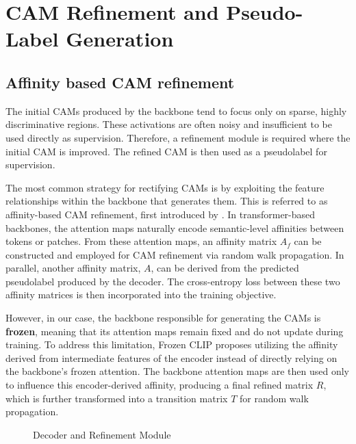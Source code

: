 \section{CAM Refinement and Pseudo-Label Generation}
\label{sec:refinement}
\subsection{Affinity based CAM refinement}  
The initial CAMs produced by the backbone tend to focus only on sparse, highly discriminative regions. These activations are often noisy and insufficient to be used directly as supervision. Therefore, a refinement module is required where the initial CAM is improved. The refined CAM is then used as a pseudolabel for supervision.  

The most common strategy for rectifying CAMs is by exploiting the feature relationships within the backbone that generates them. This is referred to as affinity-based CAM refinement, first introduced by \cite{wsss_affinitynet}. In transformer-based backbones, the attention maps naturally encode semantic-level affinities between tokens or patches. From these attention maps, an affinity matrix $A_f$ can be constructed and employed for CAM refinement via random walk propagation. In parallel, another affinity matrix, $A$, can be derived from the predicted pseudolabel produced by the decoder. The cross-entropy loss between these two affinity matrices is then incorporated into the training objective.  

However, in our case, the backbone responsible for generating the CAMs is \textbf{frozen}, meaning that its attention maps remain fixed and do not update during training. To address this limitation, Frozen CLIP \cite{wsss_frozen_clip} proposes utilizing the affinity derived from intermediate features of the encoder instead of directly relying on the backbone's frozen attention. The backbone attention maps are then used only to influence this encoder-derived affinity, producing a final refined matrix $R$, which is further transformed into a transition matrix $T$ for random walk propagation.  

\begin{figure}[t]
    \centering
    \caption{Decoder and Refinement Module}
    \label{fig:decoder}
\end{figure}

